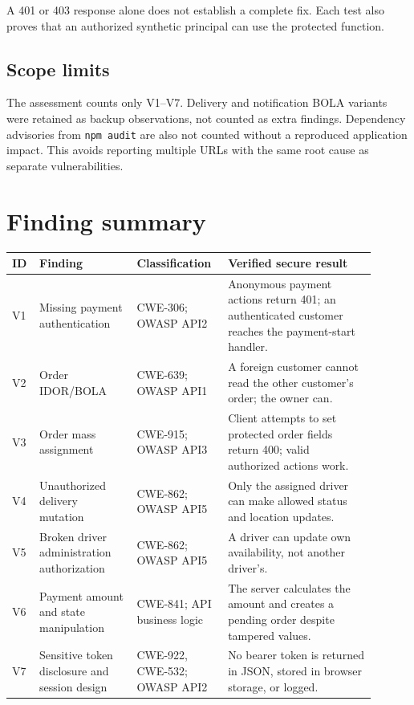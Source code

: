 \documentclass[11pt]{article}
\begin{document}
A 401 or 403 response alone does not establish a complete fix. Each test also proves that an authorized synthetic principal can use the protected function.

\subsection{Scope limits}
The assessment counts only V1--V7. Delivery and notification BOLA variants were retained as backup observations, not counted as extra findings. Dependency advisories from \texttt{npm audit} are also not counted without a reproduced application impact. This avoids reporting multiple URLs with the same root cause as separate vulnerabilities.

\section{Finding summary}\label{sec:findings}
\begin{longtable}{P{0.055\linewidth}P{0.25\linewidth}P{0.22\linewidth}P{0.38\linewidth}}
\toprule
{}\textbf{ID} & \textbf{Finding} & \textbf{Classification} & \textbf{Verified secure result} \\
\midrule
\endhead
V1 & Missing payment authentication & CWE-306; OWASP API2 & Anonymous payment actions return 401; an authenticated customer reaches the payment-start handler. \\
V2 & Order IDOR/BOLA & CWE-639; OWASP API1 & A foreign customer cannot read the other customer's order; the owner can. \\
V3 & Order mass assignment & CWE-915; OWASP API3 & Client attempts to set protected order fields return 400; valid authorized actions work. \\
V4 & Unauthorized delivery mutation & CWE-862; OWASP API5 & Only the assigned driver can make allowed status and location updates. \\
V5 & Broken driver administration authorization & CWE-862; OWASP API5 & A driver can update own availability, not another driver's. \\
V6 & Payment amount and state manipulation & CWE-841; API business logic & The server calculates the amount and creates a pending order despite tampered values. \\
V7 & Sensitive token disclosure and session design & CWE-922, CWE-532; OWASP API2 & No bearer token is returned in JSON, stored in browser storage, or logged. \\
\bottomrule
\end{longtable}
\end{document}
